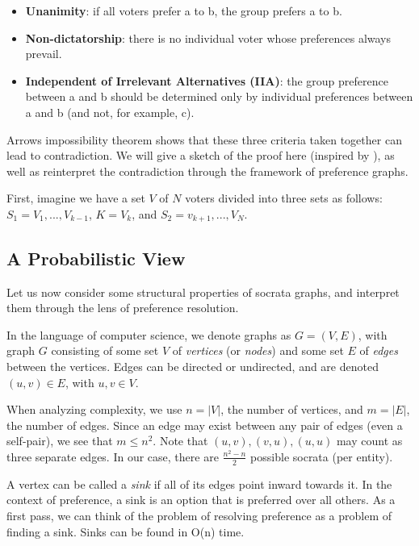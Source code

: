 \begin{itemize}
	\item \textbf{Unanimity}: if all voters prefer a to b, the group prefers a to b.
	\item \textbf{Non-dictatorship}: there is no individual voter whose preferences always prevail.
	\item \textbf{Independent of Irrelevant Alternatives (IIA)}: the group preference between a and b should be determined only by individual preferences between a and b (and not, for example, c).
\end{itemize}

Arrows impossibility theorem shows that these three criteria taken together can lead to contradiction.
We will give a sketch of the proof here (inspired by ), as well as reinterpret the contradiction through the framework of preference graphs.

\bigskip

First, imagine we have a set $V$ of $N$ voters divided into three sets as follows: $S_1 = V_1, ..., V_{k-1}$, $K = V_k$, and $S_2 = v_{k+1}, ..., V_N$.

\subsection{A Probabilistic View}

Let us now consider some structural properties of socrata graphs, and interpret them through the lens of preference resolution.

In the language of computer science, we denote graphs as $G = (V, E)$, with graph $G$ consisting of some set $V$ of \textit{vertices} (or \textit{nodes}) and some set $E$ of \textit{edges} between the vertices.
Edges can be directed or undirected, and are denoted $(u,v) \in E$, with $u, v \in V$.

When analyzing complexity, we use $n = |V|$, the number of vertices, and $m = |E|$, the number of edges.
Since an edge may exist between any pair of edges (even a self-pair), we see that $m \leq n^2$.
Note that $(u,v), (v,u), (u,u)$ may count as three separate edges.
In our case, there are $\frac{n^2-n}{2}$ possible socrata (per entity).

A vertex can be called a \textit{sink} if all of its edges point inward towards it.
In the context of preference, a sink is an option that is preferred over all others.
As a first pass, we can think of the problem of resolving preference as a problem of finding a sink.
Sinks can be found in O(n) time.

